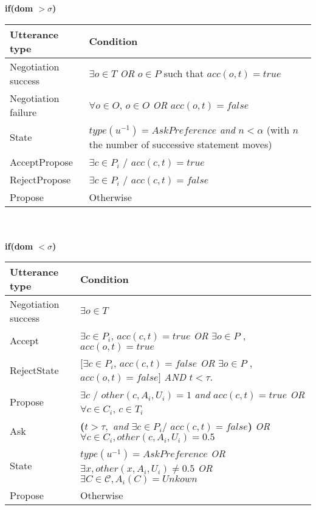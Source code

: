 \documentclass{article}
\begin{document}
	
	\textbf{if(\textbf{dom  $>\sigma$})} \\
	\begin{tabular}{|p{3cm}|p{9cm}|}
		\hline
		\textbf{Utterance type} & Condition \\
		\hline
		 Negotiation success & $\exists o \in T$   \emph{OR} $o \in P$ such that  $acc(o,t) = true$ \\
		\hline
		Negotiation failure & $ \forall o \in O$,  $o \in O$  \emph{OR} $acc(o,t) = false$\\
		\hline
		State & $type(u^{-1}) = AskPreference$  \textit{ and }
		$n < \alpha$ (with $n$ the number of successive statement moves)\\
		\hline
		AcceptPropose & $\exists c \in P_i$ / $acc(c,t)= true$ \\
		\hline
		RejectPropose & $\exists c \in P_i$ / $acc(c,t)= false$ \\
		\hline
		Propose & Otherwise  \\
		
	\hline
	\end{tabular}
	\\ \\
		
	\textbf{if(\textbf{dom  $<\sigma$})} \\
	
	\begin{tabular}{|p{3cm}|p{9cm}|}
		\hline
		\textbf{Utterance type} & Condition \\
		\hline
		Negotiation success &  $\exists o \in T$ \\
		\hline
		Accept & $\exists c \in P_i$, $acc(c, t)=true $ \newline \emph{OR}   \newline $ \exists o \in P$ ,  $acc(o, t) =true$ \\
		\hline
		RejectState & $ [\exists c \in P_i$, $acc(c, t)= false $  \emph{OR}   $ \exists o \in P$ ,  $acc(o, t)=false]$ \newline  \emph{AND} $t<\tau$.\\
		\hline
		Propose & $\exists c$ / $other(c, A_i, U_i)  = 1 $  \emph{and}
		\newline $acc(c, t)=true$
		\newline \emph{OR}  
		\newline $\forall c \in C_i$,  $c \in T_i$\\
		\hline
		Ask &  \textbf{(}$t> \tau,$ \emph{and} 
		$\exists c \in P_i /$
		 $ acc(c, t)=false$\textbf{) }
		\newline \emph{OR}
		\newline $ \forall c \in C_i,other(c, A_i, U_i)=0.5$ \\
		\hline
		
		State & $type(u^{-1}) = AskPreference$
		\newline \emph{OR}
		\newline $\exists x,other(x, A_i, U_i) \not = 0.5 $ 
		\newline \emph{OR}
		\newline $ \exists C \in \mathcal{C}, A_i(C) = Unkown$
		\\
		\hline
			Propose & Otherwise \\
		\hline
	\end{tabular}
	
\end{document}
